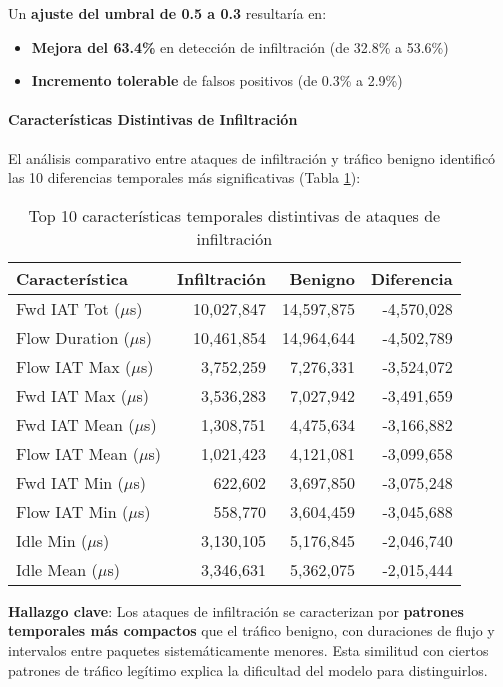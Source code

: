 Un \textbf{ajuste del umbral de 0.5 a 0.3} resultaría en:
\begin{itemize}
\item \textbf{Mejora del 63.4\%} en detección de infiltración (de 32.8\% a 53.6\%)
\item \textbf{Incremento tolerable} de falsos positivos (de 0.3\% a 2.9\%)
\end{itemize}

\paragraph{Características Distintivas de Infiltración}

El análisis comparativo entre ataques de infiltración y tráfico benigno identificó las 10 diferencias temporales más significativas (Tabla \ref{tab:infiltration_features}):

\begin{table}[H]
\centering
\begin{tabular}{lrrr}
\toprule
\textbf{Característica} & \textbf{Infiltración} & \textbf{Benigno} & \textbf{Diferencia} \\
\midrule
Fwd IAT Tot ($\mu$s) & 10,027,847 & 14,597,875 & -4,570,028 \\
Flow Duration ($\mu$s) & 10,461,854 & 14,964,644 & -4,502,789 \\
Flow IAT Max ($\mu$s) & 3,752,259 & 7,276,331 & -3,524,072 \\
Fwd IAT Max ($\mu$s) & 3,536,283 & 7,027,942 & -3,491,659 \\
Fwd IAT Mean ($\mu$s) & 1,308,751 & 4,475,634 & -3,166,882 \\
Flow IAT Mean ($\mu$s) & 1,021,423 & 4,121,081 & -3,099,658 \\
Fwd IAT Min ($\mu$s) & 622,602 & 3,697,850 & -3,075,248 \\
Flow IAT Min ($\mu$s) & 558,770 & 3,604,459 & -3,045,688 \\
Idle Min ($\mu$s) & 3,130,105 & 5,176,845 & -2,046,740 \\
Idle Mean ($\mu$s) & 3,346,631 & 5,362,075 & -2,015,444 \\
\bottomrule
\end{tabular}
\caption{Top 10 características temporales distintivas de ataques de infiltración}
\label{tab:infiltration_features}
\end{table}

\textbf{Hallazgo clave}: Los ataques de infiltración se caracterizan por \textbf{patrones temporales más compactos} que el tráfico benigno, con duraciones de flujo y intervalos entre paquetes sistemáticamente menores. Esta similitud con ciertos patrones de tráfico legítimo explica la dificultad del modelo para distinguirlos.

